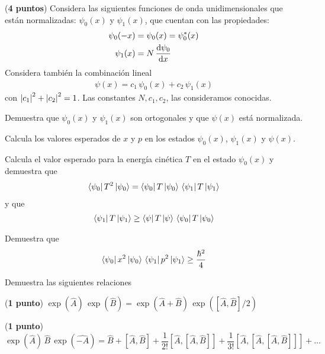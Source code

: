 \begin{milista}
\begin{milista}
\end{milista}
\item (\textbf{4 puntos}) Considera las siguientes funciones de onda unidimensionales que están normalizadas: $\psi_{0}(x)$ y $\psi_{1}(x)$, que cuentan con las propiedades:
\begin{align*}
\psi_{0}(-x) &= \psi_{0}(x) = \psi_{0}^{*} (x) \\
\psi_{1}(x) &= N \, \dv{\psi_{0}}{x}
\end{align*}
Considera también la combinación lineal
\begin{align*}
\psi(x) = c_{1} \, \psi_{0}(x) + c_{2} \, \psi_{1} (x)
\end{align*}
con $\abs{c_{1}}^{2} + \abs{c_{2}}^{2} = 1$. Las constantes $N, c_{1}, c_{2}$, las consideramos conocidas.
\begin{milista}
\item Demuestra que $\psi_{0}(x)$ y $\psi_{1}(x)$ son ortogonales y que $\psi(x)$ está normalizada.
\item Calcula los valores esperados de $x$ y $p$ en los estados $\psi_{0}(x)$, $\psi_{1}(x)$ y $\psi(x)$.
\item Calcula el valor esperado para la energía cinética $T$ en el estado $\psi_{0}(x)$ y demuestra que
\begin{align*}
\bra{\psi_{0}} T^{2} \ket{\psi_{0}} = \bra{\psi_{0}} T \ket{\psi_{0}} \, \bra{\psi_{1}} T \ket{\psi_{1}}
\end{align*}
y que 
\begin{align*}
\bra{\psi_{1}} T \ket{\psi_{1}} \geq \bra{\psi} T \ket{\psi} \, \bra{\psi_{0}} T \ket{\psi_{0}}
\end{align*}
\item Demuestra que
\begin{align*}
\bra{\psi_{0}} x^{2} \ket{\psi_{0}} \, \bra{\psi_{1}} p^{2} \ket{\psi_{1}} \geq \dfrac{\hbar^{2}}{4}
\end{align*}
\end{milista}
Demuestra las siguientes relaciones
\item (\textbf{1 punto}) $\exp(\hat{A}) \, \exp(\hat{B}) = \exp(\hat{A} + \hat{B}) \, \exp([\hat{A}, \hat{B}]/2)$
\item (\textbf{1 punto}) $\exp(\hat{A}) \, \hat{B} \, \exp(\hat{-A}) = \hat{B} + [\hat{A}, \hat{B}] + \dfrac{1}{2!} [\hat{A}, [\hat{A}, \hat{B}]] + \dfrac{1}{3!} [\hat{A}, [ \hat{A}, [\hat{A}, \hat{B}]]] + \ldots$
\end{milista}
